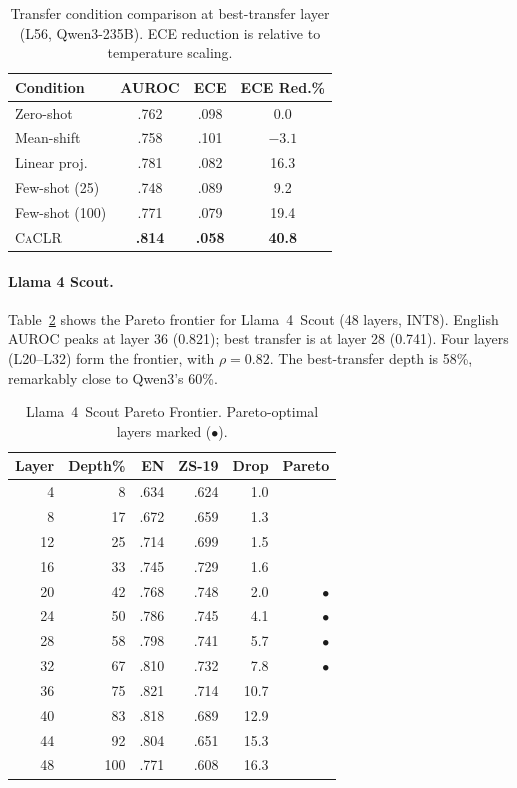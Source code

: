 \documentclass[11pt,a4paper]{article}
\newcommand{\caclr}{\textsc{CaCLR}}
\begin{document}
\begin{table}[t]
\centering
\small
\caption{Transfer condition comparison at best-transfer layer (L56, Qwen3-235B). ECE reduction is relative to temperature scaling.}
\label{tab:transfer_conditions}
\begin{tabular}{lccc}
\toprule
Condition & AUROC & ECE & ECE Red.\% \\
\midrule
Zero-shot & .762 & .098 & 0.0 \\
Mean-shift & .758 & .101 & $-3.1$ \\
Linear proj. & .781 & .082 & 16.3 \\
Few-shot (25) & .748 & .089 & 9.2 \\
Few-shot (100) & .771 & .079 & 19.4 \\
\caclr{} & \textbf{.814} & \textbf{.058} & \textbf{40.8} \\
\bottomrule
\end{tabular}
\end{table}

\paragraph{Llama 4 Scout.}
Table~\ref{tab:pareto_llama4} shows the Pareto frontier for Llama~4~Scout (48 layers, INT8). English AUROC peaks at layer 36 (0.821); best transfer is at layer 28 (0.741). Four layers (L20--L32) form the frontier, with $\rho=0.82$. The best-transfer depth is 58\%, remarkably close to Qwen3's 60\%.

\begin{table}[t]
\centering
\small
\caption{Llama~4~Scout Pareto Frontier. Pareto-optimal layers marked ($\bullet$).}
\label{tab:pareto_llama4}
\begin{tabular}{rrrrrr}
\toprule
Layer & Depth\% & EN & ZS-19 & Drop & Pareto \\
\midrule
4 & 8 & .634 & .624 & 1.0 & \\
8 & 17 & .672 & .659 & 1.3 & \\
12 & 25 & .714 & .699 & 1.5 & \\
16 & 33 & .745 & .729 & 1.6 & \\
20 & 42 & .768 & .748 & 2.0 & $\bullet$ \\
24 & 50 & .786 & .745 & 4.1 & $\bullet$ \\
28 & 58 & .798 & .741 & 5.7 & $\bullet$ \\
32 & 67 & .810 & .732 & 7.8 & $\bullet$ \\
36 & 75 & .821 & .714 & 10.7 & \\
40 & 83 & .818 & .689 & 12.9 & \\
44 & 92 & .804 & .651 & 15.3 & \\
48 & 100 & .771 & .608 & 16.3 & \\
\bottomrule
\end{tabular}
\end{table}
\end{document}
